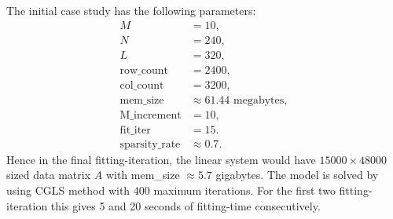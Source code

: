 \documentclass[12pt]{article}
\begin{document}
The initial case study has the following parameters:
\begin{equation*}
	\begin{split}
		M &= 10,\\
		N &= 240,\\
		L &= 320, \\
		\text{row\_count} &= 2400,\\
		\text{col\_count} &= 3200, \\
		\text{mem\_size} &\approx 61.44 \text{ megabytes}, \\
		\text{M\_increment} &= 10, \\
		\text{fit\_iter} &= 15. \\
		\text{sparsity\_rate} &\approx 0.7.
	\end{split}
\end{equation*}
Hence in the final fitting-iteration, the linear system would have $15000 \times 48000$ sized data matrix $A$ with mem\_size $\approx 5.7$ gigabytes. The model is solved by using CGLS method with 400 maximum iterations. For the first two fitting-iteration this gives 5 and 20 seconds of fitting-time consecutively. 
\end{document}
